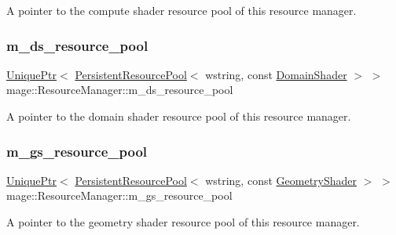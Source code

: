 A pointer to the compute shader resource pool of this resource manager. \hypertarget{classmage_1_1_resource_manager_aa58be0018fe4f93182927a84bca407f4}{}\label{classmage_1_1_resource_manager_aa58be0018fe4f93182927a84bca407f4} 
\subsubsection{\texorpdfstring{m\+\_\+ds\+\_\+resource\+\_\+pool}{m\_ds\_resource\_pool}}
{\footnotesize\ttfamily \hyperlink{namespacemage_a3316d7143a973e37adf1110f2e80ca31}{Unique\+Ptr}$<$ \hyperlink{classmage_1_1_persistent_resource_pool}{Persistent\+Resource\+Pool}$<$ wstring, const \hyperlink{namespacemage_aef8cda73e2387cb89baa6c54a7fea542}{Domain\+Shader} $>$ $>$ mage\+::\+Resource\+Manager\+::m\+\_\+ds\+\_\+resource\+\_\+pool\hspace{0.3cm}{\ttfamily [private]}}

A pointer to the domain shader resource pool of this resource manager. \hypertarget{classmage_1_1_resource_manager_a2b0c4dfc6473c6c8aa9a0f3ebc30c1dd}{}\label{classmage_1_1_resource_manager_a2b0c4dfc6473c6c8aa9a0f3ebc30c1dd} 
\subsubsection{\texorpdfstring{m\+\_\+gs\+\_\+resource\+\_\+pool}{m\_gs\_resource\_pool}}
{\footnotesize\ttfamily \hyperlink{namespacemage_a3316d7143a973e37adf1110f2e80ca31}{Unique\+Ptr}$<$ \hyperlink{classmage_1_1_persistent_resource_pool}{Persistent\+Resource\+Pool}$<$ wstring, const \hyperlink{namespacemage_a0cf0bb4b74903e78658c96412d5687a6}{Geometry\+Shader} $>$ $>$ mage\+::\+Resource\+Manager\+::m\+\_\+gs\+\_\+resource\+\_\+pool\hspace{0.3cm}{\ttfamily [private]}}

A pointer to the geometry shader resource pool of this resource manager. \hypertarget{classmage_1_1_resource_manager_a8f5118a694baef442f467ef8658f93b6}{}\label{classmage_1_1_resource_manager_a8f5118a694baef442f467ef8658f93b6} 

